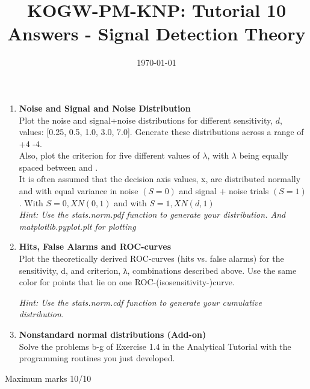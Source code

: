 \documentclass[12pt,english]{scrartcl}
\title{KOGW-PM-KNP: Tutorial 10 Answers - Signal Detection Theory}
\author{}
\date{\today}
\begin{document}
\maketitle



\begin{enumerate}
\item \textbf{Noise and Signal and Noise Distribution} \\

Plot the noise and signal+noise distributions for different sensitivity, $d$, values: [0.25, 0.5, 1.0, 3.0, 7.0]. Generate these distributions across a range of  +4 -4. \\

Also, plot the criterion for five different values of $\lambda$, with $\lambda$ being equally spaced between and . \\

It is often assumed that the decision axis values, x, are distributed normally and with equal variance in noise $(S = 0)$ and signal $+$ noise trials $(S = 1)$. With $S = 0, X  N(0, 1)$ and with $S = 1, X  N(d,1)$ \\

\textit{Hint: Use the stats.norm.pdf function to generate your distribution. And matplotlib.pyplot.plt for plotting}

\color{black}
\item \textbf{Hits, False Alarms and ROC-curves} \\
 
Plot the theoretically derived ROC-curves (hits vs. false alarms) for the sensitivity, d, and criterion, λ, combinations described above. Use the same color for points that lie on one ROC-(isosensitivity-)curve.

\textit{Hint: Use the stats.norm.cdf function to generate your cumulative distribution.}
  
\color{black}
\item \textbf{Nonstandard normal distributions (Add-on)} \\
Solve the problems b-g of Exercise 1.4 in the Analytical Tutorial with the programming routines you just developed.
   

\end{enumerate}
 \color{black}
 Maximum marks 10/10 \\
\end{document}

